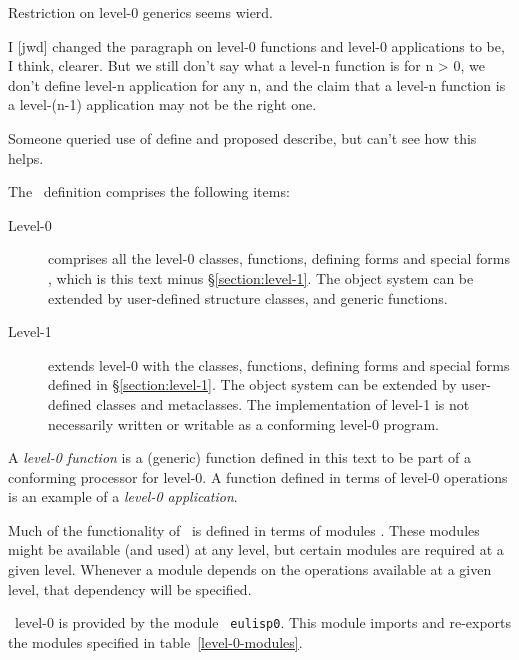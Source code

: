 \label{subsec:lang-struct}
%
\begin{optPrivate}
    Restriction on level-0 generics seems wierd.

    I [jwd] changed the paragraph on level-0 functions and level-0 applications
    to be, I think, clearer.  But we still don't say what a level-n function is
    for n > 0, we don't define level-n application for any n, and the claim that
    a level-n function is a level-(n-1) application may not be the right one.

    Someone queried use of define and proposed describe, but can't see how this
    helps.
\end{optPrivate}
%
\begin{optDefinition}
The \eulisp\ definition comprises the following items:
\begin{description}
    \item[Level-0] comprises all the
    level-0 classes, functions, defining forms 
    and special forms , which is this text minus
    \S\ref{section:level-1}.  The object system can be extended by
    user-defined structure classes, and generic functions.

    \item[Level-1] extends level-0 with
    the classes, functions, defining forms and special forms defined in
    \S\ref{section:level-1}.  The object system can be extended by user-defined
    classes and metaclasses.  The implementation of level-1 is not necessarily
    written or writable as a conforming level-0 program.
\end{description}
%
A {\em level-0 function\/} is a (generic) function defined in this text to be
part of a conforming processor for level-0.  A function defined in terms of
level-0 operations is an example of a {\em level-0 application}.

Much of the functionality of \eulisp\ is defined in terms of modules
 .
These modules might be available (and used) at any level, but certain modules
are required at a given level.  Whenever a module depends on the operations
available at a given level, that dependency will be specified.

\eulisp\ level-0 is provided by the module {\tt
    eulisp0}.  This module imports and
re-exports the modules specified in table~\ref{level-0-modules}.


\end{optDefinition}
